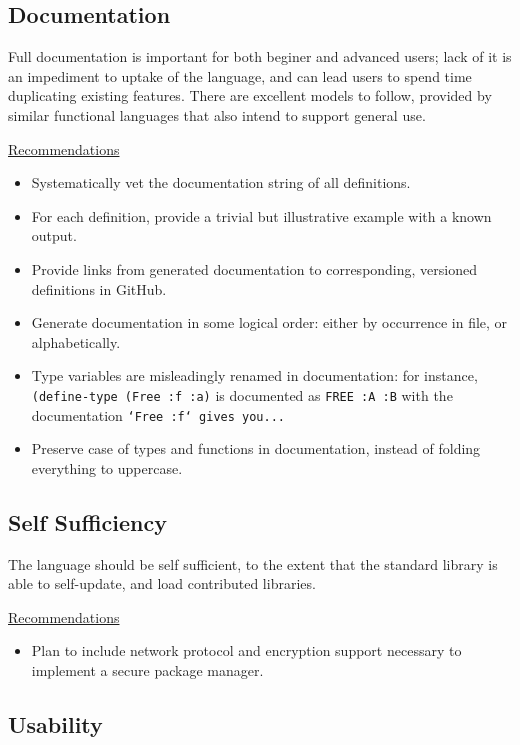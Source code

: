 \documentclass[12pt]{article}
\newcommand{\code}{\texttt}
\begin{document}
\subsection{Documentation}

Full documentation is important for both beginer and advanced users;
lack of it is an impediment to uptake of the language, and can lead
users to spend time duplicating existing features. There are excellent
models to follow, provided by similar functional languages that also
intend to support general use.

\bigskip
\underline{Recommendations}

\begin{itemize}
\item Systematically vet the documentation string of all definitions.
\item For each definition, provide a trivial but illustrative example
  with a known output.
\item Provide links from generated documentation to corresponding,
  versioned definitions in GitHub.
\item Generate documentation in some logical order: either by
  occurrence in file, or alphabetically.
\item Type variables are misleadingly renamed in documentation: for
  instance, \code{(define-type (Free :f :a)} is documented as
  \code{FREE :A :B} with the documentation \code{`Free :f` gives
    you...}
\item Preserve case of types and functions in documentation, instead
  of folding everything to uppercase.
\end{itemize}

\subsection{Self Sufficiency}

The language should be self sufficient, to the extent that the
standard library is able to self-update, and load contributed
libraries.

\bigskip
\underline{Recommendations}

\begin{itemize}
\item Plan to include network protocol and encryption support
  necessary to implement a secure package manager.
\end{itemize}

\subsection{Usability}
\end{document}

